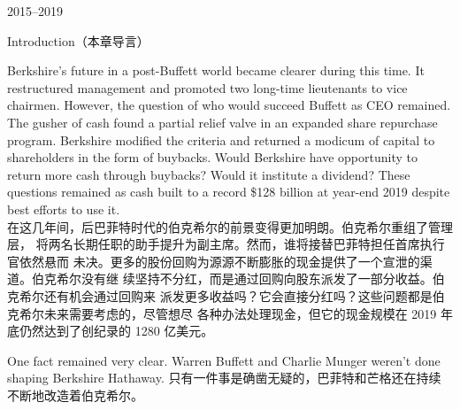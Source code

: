 \begin{chapter}{2015--2019}
\begin{section}{Introduction（本章导言）}
\begin{verseparallel}
  {
    Berkshire's future in a post-Buffett world became clearer during this time.
    It restructured management and promoted two long-time lieutenants to vice
    chairmen. However, the question of who would succeed Buffett as CEO
    remained. The gusher of cash found a partial relief valve in an expanded
    share repurchase program. Berkshire modified the criteria and returned a
    modicum of capital to shareholders in the form of buybacks. Would Berkshire
    have opportunity to return more cash through buybacks? Would it institute a
    dividend? These questions remained as cash built to a record \$128 billion at
    year-end 2019 despite best efforts to use it. \\
  }
  {
    在这几年间，后巴菲特时代的伯克希尔的前景变得更加明朗。伯克希尔重组了管理层，
    将两名长期任职的助手提升为副主席。然而，谁将接替巴菲特担任首席执行官依然悬而
    未决。更多的股份回购为源源不断膨胀的现金提供了一个宣泄的渠道。伯克希尔没有继
    续坚持不分红，而是通过回购向股东派发了一部分收益。伯克希尔还有机会通过回购来
    派发更多收益吗？它会直接分红吗？这些问题都是伯克希尔未来需要考虑的，尽管想尽
    各种办法处理现金，但它的现金规模在 2019 年底仍然达到了创纪录的 1280 亿美元。
  }
\end{verseparallel}

\begin{verseparallel}
  {
    One fact remained very clear. Warren Buffett and Charlie Munger weren't
    done shaping Berkshire Hathaway.
  }
  {
    只有一件事是确凿无疑的，巴菲特和芒格还在持续不断地改造着伯克希尔。
  }
\end{verseparallel}


\end{section}
\end{chapter}
